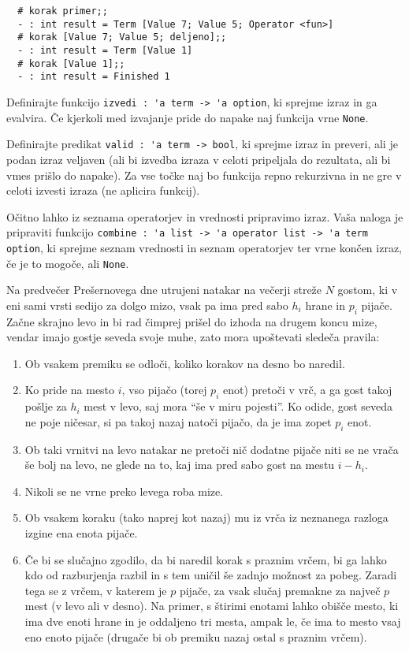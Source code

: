 \documentclass[arhiv]{../izpit}
\begin{document}
\begin{verbatim}
  # korak primer;;
  - : int result = Term [Value 7; Value 5; Operator <fun>]
  # korak [Value 7; Value 5; deljeno];;
  - : int result = Term [Value 1]
  # korak [Value 1];;
  - : int result = Finished 1
\end{verbatim}

\podnaloga
Definirajte funkcijo \verb|izvedi : 'a term -> 'a option|, ki sprejme izraz in ga evalvira. 
Če kjerkoli med izvajanje pride do napake naj funkcija vrne \verb|None|.

\podnaloga
Definirajte predikat \verb|valid : 'a term -> bool|, ki sprejme izraz in preveri, 
ali je podan izraz veljaven (ali bi izvedba izraza v celoti pripeljala do rezultata, 
ali bi vmes prišlo do napake). 
Za vse točke naj bo funkcija repno rekurzivna in ne gre v celoti izvesti izraza (ne aplicira funkcij).

\podnaloga
Očitno lahko iz seznama operatorjev in vrednosti pripravimo izraz. 
Vaša naloga je pripraviti funkcijo \verb|combine : 'a list -> 'a operator list -> 'a term option|, 
ki sprejme seznam vrednosti in seznam operatorjev ter vrne končen izraz, če je to mogoče, ali \verb|None|.


\naloga

Na predvečer Prešernovega dne utrujeni natakar na večerji streže $N$ gostom, ki v eni sami vrsti sedijo za dolgo mizo, vsak pa ima pred sabo $h_i$ hrane in $p_i$ pijače. Začne skrajno levo in bi rad čimprej prišel do izhoda na drugem koncu mize, vendar imajo gostje seveda svoje muhe, zato mora upoštevati sledeča pravila:

\begin{enumerate}
  \item Ob vsakem premiku se odloči, koliko korakov na desno bo naredil. 
  \item\label{i:obisk} Ko pride na mesto $i$, vso pijačo (torej $p_i$ enot) pretoči v vrč, a ga gost takoj pošlje za $h_i$ mest v levo, saj mora ``še v miru pojesti''. Ko odide, gost seveda ne poje ničesar, si pa takoj nazaj natoči pijačo, da je ima zopet $p_i$ enot.
  \item Ob taki vrnitvi na levo natakar ne pretoči nič dodatne pijače niti se ne vrača še bolj na levo, ne glede na to, kaj ima pred sabo gost na mestu $i - h_i$.
  \item Nikoli se ne vrne preko levega roba mize.
  \item Ob vsakem koraku (tako naprej kot nazaj) mu iz vrča iz neznanega razloga izgine ena enota pijače.
  \item Če bi se slučajno zgodilo, da bi naredil korak s praznim vrčem, bi ga lahko kdo od razburjenja razbil in s tem uničil še zadnjo možnost za pobeg. Zaradi tega se z vrčem, v katerem je $p$ pijače, za vsak slučaj premakne za največ $p$ mest (v levo ali v desno). Na primer, s štirimi enotami lahko obišče mesto, ki ima dve enoti hrane in je oddaljeno tri mesta, ampak le, če ima to mesto vsaj eno enoto pijače (drugače bi ob premiku nazaj ostal s praznim vrčem).
\end{enumerate}
\end{document}
